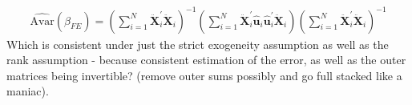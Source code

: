\begin{align*}
    \hat{\text{Avar}}(\hat{\beta}_{FE}) = \left( \sum_{i=1}^N \bm{\ddot{X}}_i^\prime \bm{\ddot{X}}_i \right)^{-1} \left( \sum_{i=1}^N \bm{\ddot{X}}_i^\prime \hat{\bm{u}}_i \hat{\bm{u}}_i^\prime \bm{\ddot{X}}_i \right) \left( \sum_{i=1}^N \bm{\ddot{X}}_i^\prime \bm{\ddot{X}}_i \right)^{-1}
\end{align*} 
Which is consistent under just the strict exogeneity assumption as well as the rank assumption - because consistent estimation of the error, as well as the outer matrices being invertible? (remove outer sums possibly and go full stacked like a maniac). 